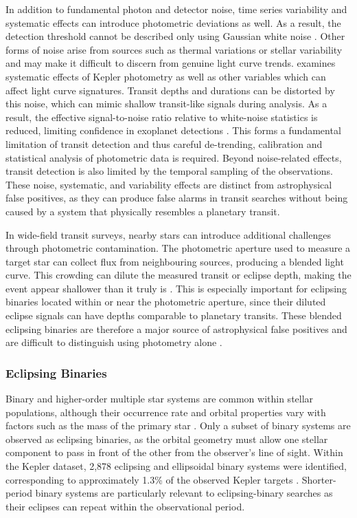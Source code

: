 In addition to fundamental photon and detector noise, time series variability and systematic effects can  introduce photometric deviations as well. As a result, the detection threshold cannot be described only using Gaussian white noise \citep{2006MNRAS.373..231P}. Other forms of noise arise from sources such as thermal variations or stellar variability and may make it difficult to discern from genuine light curve trends. \cite{2012PASP..124.1000S} examines systematic effects of Kepler photometry as well as other variables which can affect light curve signatures. Transit depths and durations can be distorted by this noise, which can mimic shallow transit-like signals during analysis. As a result, the effective signal-to-noise ratio relative to white-noise statistics is reduced, limiting confidence in exoplanet detections \citep{2006MNRAS.373..799C}. This forms a fundamental limitation of transit detection and thus careful de-trending, calibration and statistical analysis of photometric data is required. Beyond noise-related effects, transit detection is also limited by the temporal sampling of the observations. These noise, systematic, and variability effects are distinct from astrophysical false positives, as they can produce false alarms in transit searches without being caused by a system that physically resembles a planetary transit.

In wide-field transit surveys, nearby stars can introduce additional challenges through photometric contamination. The photometric aperture used to measure a target star can collect flux from neighbouring sources, producing a blended light curve. This crowding can dilute the measured transit or eclipse depth, making the event appear shallower than it truly is \citep{Morton_2016}. This is especially important for eclipsing binaries located within or near the photometric aperture, since their diluted eclipse signals can have depths comparable to planetary transits. These blended eclipsing binaries are therefore a major source of astrophysical false positives and are difficult to distinguish using photometry alone \citep{2011ApJ...738..170M}.

\subsubsection{Eclipsing Binaries}

Binary and higher-order multiple star systems are common within stellar populations, although their occurrence rate and orbital properties vary with factors such as the mass of the primary star \citep{Duchene}. Only a subset of binary systems are observed as eclipsing binaries, as the orbital geometry must allow one stellar component to pass in front of the other from the observer's line of sight. Within the Kepler dataset, 2,878 eclipsing and ellipsoidal binary systems were identified, corresponding to approximately 1.3\% of the observed Kepler targets \citep{Kirk_2016}. Shorter-period binary systems are particularly relevant to eclipsing-binary searches as their eclipses can repeat within the observational period.


